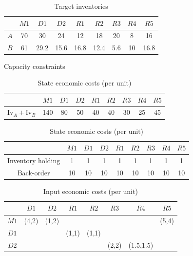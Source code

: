 \documentclass{elsarticle}
\newcommand{\Inv}{\textrm{Iv}}
\theoremstyle{definition}
\begin{document}
\begin{table}
\caption{Target inventories}
\label{tab:esc:targinv}
\centering
\begin{tabular}{ccccccccc}\toprule
& $M1$ & $D1$ & $D2$  & $R1$ & $R2$ & $R3$ & $R4$ & $R5$ \\
\midrule
$A$&70&30  &24   &12  &18  &20 &8 &16\\
$B$&61&29.2&15.6 &16.8&12.4&5.6&10&16.8 \\
\bottomrule
\end{tabular}
\end{table}
\begin{table}
\caption{Capacity constraints}
\label{tab:esc:constraints}
\centering
\begin{tabular}{ccccccccc}\toprule
& $M1$ & $D1$ & $D2$  & $R1$ & $R2$ & $R3$ & $R4$ & $R5$ \\
\midrule
$\Inv_A+\Inv_B$&140&80  &50   &40  &40  &30 &25 &45\\
\bottomrule
\end{tabular}
\caption{State economic costs (per unit)}
\label{tab:esc:state_economic}
\centering
\begin{tabular}{ccccccccc}\toprule
& $M1$ & $D1$ & $D2$  & $R1$ & $R2$ & $R3$ & $R4$ & $R5$ \\
\midrule
Inventory holding &1&1  &1   &1  &1  &1 &1 &1\\
Back-order &10&10&10 &10&10&10&10&10 \\
\bottomrule
\end{tabular}
\end{table}
\begin{table}
\caption{Input economic costs (per unit)}
\label{tab:esc:input_economic}
\centering
\begin{tabular}{cccccccc}\toprule
& $D1$ & $D2$  & $R1$ & $R2$ & $R3$ & $R4$ & $R5$ \\
\midrule
$M1$ &(4,2)&(1,2)& & & & &(5,4)\\
$D1$ & & &(1,1)&(1,1)& & & \\
$D2$ & & & & &(2,2)&(1.5,1.5)& \\
\bottomrule
\end{tabular}
\end{table}
\end{document}
